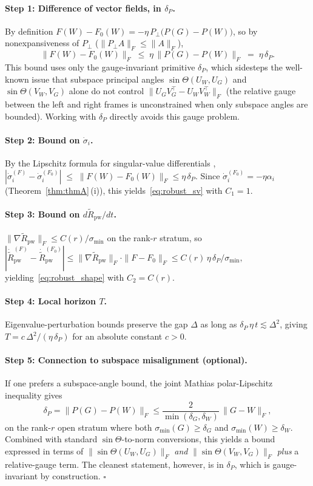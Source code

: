 \documentclass{article}
\begin{document}
\paragraph{Step 1: Difference of vector fields, in $\delta_P$.}
By definition $F(W)-F_0(W) = -\eta\,P_\perp\bigl(P(G)-P(W)\bigr)$, so by nonexpansiveness of $P_\perp$ ($\|P_\perp A\|_F\leq\|A\|_F$),
\[
\|F(W) - F_0(W)\|_F \;\leq\; \eta\,\|P(G)-P(W)\|_F \;=\; \eta\,\delta_P.
\]
This bound uses only the gauge-invariant primitive $\delta_P$, which sidesteps the well-known issue that subspace principal angles $\sin\Theta(U_W,U_G)$ and $\sin\Theta(V_W,V_G)$ alone do not control $\|U_G V_G^\top - U_W V_W^\top\|_F$ (the relative gauge between the left and right frames is unconstrained when only subspace angles are bounded). Working with $\delta_P$ directly avoids this gauge problem.

\paragraph{Step 2: Bound on $\dot\sigma_i$.}
By the Lipschitz formula for singular-value differentials \citep{stewart1990matrix},
\(|\dot\sigma_i^{(F)} - \dot\sigma_i^{(F_0)}| \;\leq\; \|F(W)-F_0(W)\|_F \leq \eta\,\delta_P.\)
Since $\dot\sigma_i^{(F_0)} = -\eta\alpha_i$ (Theorem~\ref{thm:thmA}\,(i)), this yields~\eqref{eq:robust_sv} with $C_1 = 1$.

\paragraph{Step 3: Bound on $d\widetilde R_{\mathrm{pw}}/dt$.}
$\|\nabla\widetilde R_{\mathrm{pw}}\|_F\leq C(r)/\sigma_{\min}$ on the rank-$r$ stratum, so
\(|\dot{\widetilde R}_{\mathrm{pw}}^{(F)} - \dot{\widetilde R}_{\mathrm{pw}}^{(F_0)}| \leq \|\nabla\widetilde R_{\mathrm{pw}}\|_F\cdot\|F-F_0\|_F \leq C(r)\,\eta\,\delta_P/\sigma_{\min},\)
yielding~\eqref{eq:robust_shape} with $C_2 = C(r)$.

\paragraph{Step 4: Local horizon $T$.}
Eigenvalue-perturbation bounds preserve the gap $\Delta$ as long as $\delta_P\,\eta\,t \lesssim \Delta^2$, giving $T = c\,\Delta^2/(\eta\,\delta_P)$ for an absolute constant $c>0$.

\paragraph{Step 5: Connection to subspace misalignment (optional).}
If one prefers a subspace-angle bound, the joint Mathias polar-Lipschitz inequality \citep{mathias1993polar} gives
\[
\delta_P = \|P(G)-P(W)\|_F \leq \frac{2}{\min(\delta_G,\delta_W)}\,\|G - W\|_F,
\]
on the rank-$r$ open stratum where both $\sigma_{\min}(G)\geq\delta_G$ and $\sigma_{\min}(W)\geq\delta_W$. Combined with standard $\sin\Theta$-to-norm conversions, this yields a bound expressed in terms of $\|\sin\Theta(U_W,U_G)\|_F$ \emph{and} $\|\sin\Theta(V_W,V_G)\|_F$ \emph{plus} a relative-gauge term. The cleanest statement, however, is in $\delta_P$, which is gauge-invariant by construction. \hfill$\square$
\end{document}
